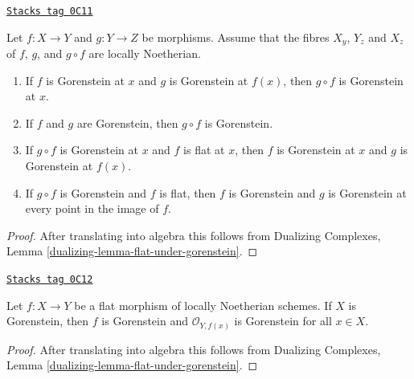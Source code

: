 \begin{lemma}
\label{duality-lemma-composition-gorenstein}
\href{https://stacks.math.columbia.edu/tag/0C11}{\texttt{Stacks tag 0C11}}

Let $f : X \to Y$ and $g : Y \to Z$ be morphisms. Assume that the
fibres $X_y$, $Y_z$ and $X_z$ of $f$, $g$, and $g \circ f$ are
locally Noetherian.
\begin{enumerate}
\item If $f$ is Gorenstein at $x$ and $g$ is Gorenstein
at $f(x)$, then $g \circ f$ is Gorenstein at $x$.
\item If $f$ and $g$ are Gorenstein, then $g \circ f$ is Gorenstein.
\item If $g \circ f$ is Gorenstein at $x$ and $f$ is flat at $x$,
then $f$ is Gorenstein at $x$ and $g$ is Gorenstein at $f(x)$.
\item If $g \circ f$ is Gorenstein and $f$ is flat, then
$f$ is Gorenstein and $g$ is Gorenstein at every point in
the image of $f$.
\end{enumerate}
\end{lemma}

\begin{proof}
After translating into algebra this follows from
Dualizing Complexes, Lemma \ref{dualizing-lemma-flat-under-gorenstein}.
\end{proof}

\begin{lemma}
\label{duality-lemma-flat-morphism-from-gorenstein-scheme}
\href{https://stacks.math.columbia.edu/tag/0C12}{\texttt{Stacks tag 0C12}}


Let $f : X \to Y$ be a flat morphism of locally Noetherian schemes.
If $X$ is Gorenstein, then $f$ is Gorenstein and $\mathcal{O}_{Y, f(x)}$
is Gorenstein for all $x \in X$.
\end{lemma}

\begin{proof}
After translating into algebra this follows from
Dualizing Complexes, Lemma \ref{dualizing-lemma-flat-under-gorenstein}.
\end{proof}

